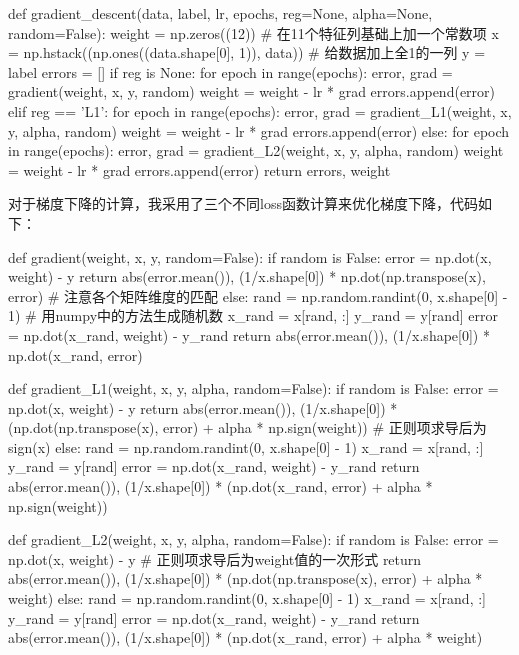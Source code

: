 \documentclass[UTF8,a4paper,10pt]{ctexart}
\begin{document}
\begin{python}
   def gradient_descent(data, label, lr, epochs, reg=None, alpha=None, random=False):
    weight = np.zeros((12))  # 在11个特征列基础上加一个常数项
    x = np.hstack((np.ones((data.shape[0], 1)), data))  # 给数据加上全1的一列
    y = label
    errors = []
    if reg is None:
        for epoch in range(epochs):
            error, grad = gradient(weight, x, y, random)
            weight = weight - lr * grad
            errors.append(error)
    elif reg == 'L1':
        for epoch in range(epochs):
            error, grad = gradient_L1(weight, x, y, alpha, random)
            weight = weight - lr * grad
            errors.append(error)
    else:
        for epoch in range(epochs):
            error, grad = gradient_L2(weight, x, y, alpha, random)
            weight = weight - lr * grad
            errors.append(error)
    return errors, weight
\end{python}

对于梯度下降的计算，我采用了三个不同loss函数计算来优化梯度下降，代码如下：

\begin{python}
   def gradient(weight, x, y, random=False):
    if random is False:
        error = np.dot(x, weight) - y
        return abs(error.mean()), (1/x.shape[0]) * np.dot(np.transpose(x), error)  # 注意各个矩阵维度的匹配
    else:
        rand = np.random.randint(0, x.shape[0] - 1)  # 用numpy中的方法生成随机数
        x_rand = x[rand, :]
        y_rand = y[rand]
        error = np.dot(x_rand, weight) - y_rand
        return abs(error.mean()), (1/x.shape[0]) * np.dot(x_rand, error)


def gradient_L1(weight, x, y, alpha, random=False):
    if random is False:
        error = np.dot(x, weight) - y
        return abs(error.mean()), (1/x.shape[0]) * (np.dot(np.transpose(x), error)
                                                    + alpha * np.sign(weight))  # 正则项求导后为sign(x)
    else:
        rand = np.random.randint(0, x.shape[0] - 1)
        x_rand = x[rand, :]
        y_rand = y[rand]
        error = np.dot(x_rand, weight) - y_rand
        return abs(error.mean()), (1/x.shape[0]) * (np.dot(x_rand, error) + alpha * np.sign(weight))


def gradient_L2(weight, x, y, alpha, random=False):
    if random is False:
        error = np.dot(x, weight) - y
        # 正则项求导后为weight值的一次形式
        return abs(error.mean()), (1/x.shape[0]) * (np.dot(np.transpose(x), error) + alpha * weight)
    else:
        rand = np.random.randint(0, x.shape[0] - 1)
        x_rand = x[rand, :]
        y_rand = y[rand]
        error = np.dot(x_rand, weight) - y_rand
        return abs(error.mean()), (1/x.shape[0]) * (np.dot(x_rand, error) + alpha * weight)
\end{python}
\end{document}
